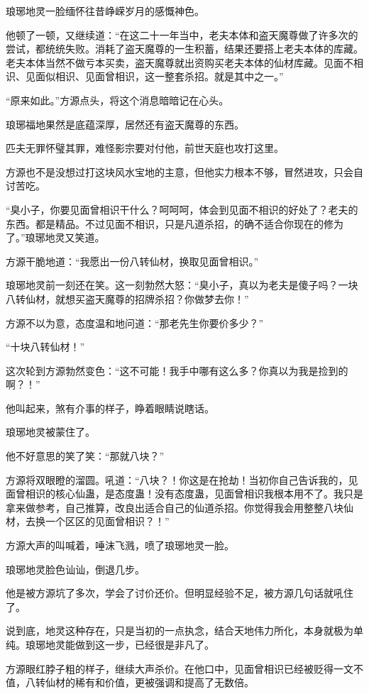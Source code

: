 \begin{this_body}
琅琊地灵一脸缅怀往昔峥嵘岁月的感慨神色。

他顿了一顿，又继续道：“在这二十一年当中，老夫本体和盗天魔尊做了许多次的尝试，都统统失败。消耗了盗天魔尊的一生积蓄，结果还要搭上老夫本体的库藏。老夫本体当然不做亏本买卖，盗天魔尊就出资购买老夫本体的仙材库藏。见面不相识、见面似相识、见面曾相识，这一整套杀招。就是其中之一。”

“原来如此。”方源点头，将这个消息暗暗记在心头。

琅琊福地果然是底蕴深厚，居然还有盗天魔尊的东西。

匹夫无罪怀璧其罪，难怪影宗要对付他，前世天庭也攻打这里。

方源也不是没想过打这块风水宝地的主意，但他实力根本不够，冒然进攻，只会自讨苦吃。

“臭小子，你要见面曾相识干什么？呵呵呵，体会到见面不相识的好处了？老夫的东西。都是精品。不过见面不相识，只是凡道杀招，的确不适合你现在的修为了。”琅琊地灵又笑道。

方源干脆地道：“我愿出一份八转仙材，换取见面曾相识。”

琅琊地灵前一刻还在笑。这一刻勃然大怒：“臭小子，真以为老夫是傻子吗？一块八转仙材，就想买盗天魔尊的招牌杀招？你做梦去你！”

方源不以为意，态度温和地问道：“那老先生你要价多少？”

“十块八转仙材！”

这次轮到方源勃然变色：“这不可能！我手中哪有这么多？你真以为我是捡到的啊？！”

他叫起来，煞有介事的样子，睁着眼睛说瞎话。

琅琊地灵被蒙住了。

他不好意思的笑了笑：“那就八块？”

方源将双眼瞪的溜圆。吼道：“八块？！你这是在抢劫！当初你自己告诉我的，见面曾相识的核心仙蛊，是态度蛊！没有态度蛊，见面曾相识我根本用不了。我只是拿来做参考，自己推算，改良出适合自己的仙道杀招。你觉得我会用整整八块仙材，去换一个区区的见面曾相识？！”

方源大声的叫喊着，唾沫飞溅，喷了琅琊地灵一脸。

琅琊地灵脸色讪讪，倒退几步。

他是被方源坑了多次，学会了讨价还价。但明显经验不足，被方源几句话就吼住了。

说到底，地灵这种存在，只是当初的一点执念，结合天地伟力所化，本身就极为单纯。琅琊地灵能做到这一步，已经很是非凡了。

方源眼红脖子粗的样子，继续大声杀价。在他口中，见面曾相识已经被贬得一文不值，八转仙材的稀有和价值，更被强调和提高了无数倍。


\end{this_body}
